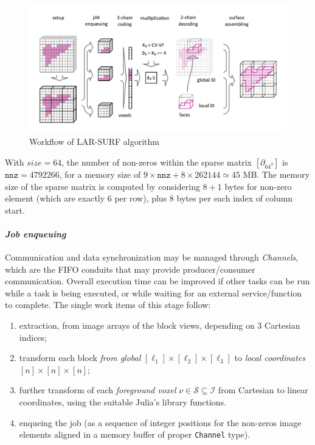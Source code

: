 \documentclass[11pt, oneside]{amsart}   	%
\begin{document}
\begin{figure}[tbp]
\includegraphics[width=\textwidth]{figs/schema_horizontal.pdf} 
\caption{Workflow of LAR-SURF algorithm}
\label{fig:schema}
\end{figure}

With $size=64$, the number of non-zeros within the sparse matrix $[\partial_{64^3}]$ is $\mathtt{nnz} = 4 792 266$, for a memory size of $9\times \mathtt{nnz}+8\times 262144 \simeq 45$ MB. The memory size of the sparse matrix is computed by considering $8+1$ bytes for non-zero element (which are exactly 6 per row), plus 8 bytes per each index of column start.  


\paragraph{\emph{Job enqueuing}}Communication and data synchronization may be managed through \emph{Channels}, which are the FIFO conduits that may provide producer/consumer communication. Overall execution time can be improved if other tasks can be run while a task is being executed, or while waiting for an external service/function to complete. The single work items of this stage follow:
\begin{enumerate}

\item extraction, from image arrays of the block views, depending on 3 Cartesian indices;

\item transform  each block \emph{from global} $[\ell_1]\times[\ell_2]\times[\ell_3]$ to \emph{local coordinates} $[n]\times[n]\times[n]$;

\item further transform of each \emph{foreground voxel} $\nu\in\mathcal{S}\subseteq\mathcal{I}$ from Cartesian to linear coordinates, using the suitable Julia's library functions.

\item enqueing the job (as a sequence of integer positions for the non-zeros image elements aligned in a memory buffer of proper \texttt{Channel} type).
\end{enumerate}
\end{document}
